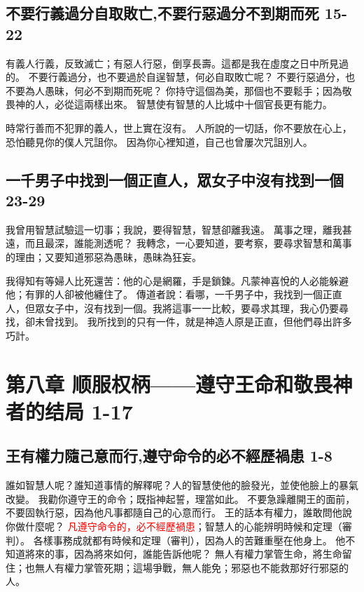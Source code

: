 \subsection{不要行義過分自取敗亡,不要行惡過分不到期而死  15-22}
有義人行義，反致滅亡；有惡人行惡，倒享長壽。這都是我在虛度之日中所見過的。
不要行義過分，也不要過於自逞智慧，何必自取敗亡呢？
不要行惡過分，也不要為人愚昧，何必不到期而死呢？
你持守這個為美，那個也不要鬆手；因為敬畏神的人，必從這兩樣出來。
智慧使有智慧的人比城中十個官長更有能力。

時常行善而不犯罪的義人，世上實在沒有。
人所說的一切話，你不要放在心上，恐怕聽見你的僕人咒詛你。
因為你心裡知道，自己也曾屢次咒詛別人。

\subsection{一千男子中找到一個正直人，眾女子中沒有找到一個 23-29}
我曾用智慧試驗這一切事；我說，要得智慧，智慧卻離我遠。
萬事之理，離我甚遠，而且最深，誰能測透呢？
我轉念，一心要知道，要考察，要尋求智慧和萬事的理由；又要知道邪惡為愚昧，愚昧為狂妄。

我得知有等婦人比死還苦：他的心是網羅，手是鎖鍊。凡蒙神喜悅的人必能躲避他；有罪的人卻被他纏住了。
傳道者說：看哪，一千男子中，我找到一個正直人，但眾女子中，沒有找到一個。我將這事一一比較，要尋求其理，我心仍要尋找，卻未曾找到。
我所找到的只有一件，就是神造人原是正直，但他們尋出許多巧計。

 
\section{第八章 顺服权柄——遵守王命和敬畏神者的结局 1-17}
\subsection{王有權力隨己意而行,遵守命令的必不經歷禍患 1-8}
誰如智慧人呢？誰知道事情的解釋呢？人的智慧使他的臉發光，並使他臉上的暴氣改變。
我勸你遵守王的命令；既指神起誓，理當如此。
不要急躁離開王的面前，不要固執行惡，因為他凡事都隨自己的心意而行。
王的話本有權力，誰敢問他說你做什麼呢？
\textcolor{red}{凡遵守命令的，必不經歷禍患}；智慧人的心能辨明時候和定理（審判）。
各樣事務成就都有時候和定理（審判），因為人的苦難重壓在他身上。
他不知道將來的事，因為將來如何，誰能告訴他呢？
無人有權力掌管生命，將生命留住；也無人有權力掌管死期；這場爭戰，無人能免；邪惡也不能救那好行邪惡的人。

